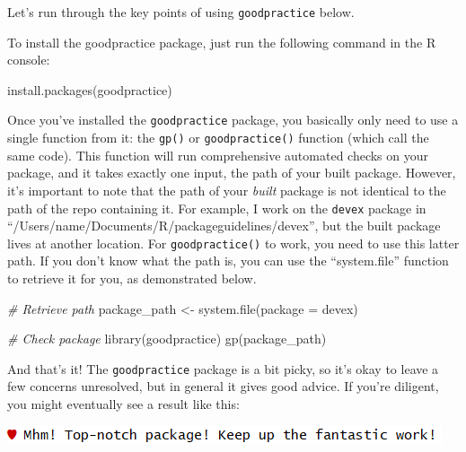 \documentclass[
]{book}
\newenvironment{Shaded}{\begin{snugshade}}{\end{snugshade}}
\newcommand{\AttributeTok}[1]{\textcolor[rgb]{0.77,0.63,0.00}{#1}}
\newcommand{\CommentTok}[1]{\textcolor[rgb]{0.56,0.35,0.01}{\textit{#1}}}
\newcommand{\FunctionTok}[1]{\textcolor[rgb]{0.00,0.00,0.00}{#1}}
\newcommand{\NormalTok}[1]{#1}
\newcommand{\OtherTok}[1]{\textcolor[rgb]{0.56,0.35,0.01}{#1}}
\newcommand{\StringTok}[1]{\textcolor[rgb]{0.31,0.60,0.02}{#1}}
\begin{document}
Let's run through the key points of using \texttt{goodpractice} below.

To install the goodpractice package, just run the following command in the R console:

\begin{Shaded}
\begin{Highlighting}[]
\FunctionTok{install.packages}\NormalTok{(}\StringTok{\textquotesingle{}goodpractice\textquotesingle{}}\NormalTok{)}
\end{Highlighting}
\end{Shaded}

Once you've installed the \texttt{goodpractice} package, you basically only need to use a single function from it: the \texttt{gp()} or \texttt{goodpractice()} function (which call the same code). This function will run comprehensive automated checks on your package, and it takes exactly one input, the path of your built package. However, it's important to note that the path of your \emph{built} package is not identical to the path of the repo containing it. For example, I work on the \texttt{devex} package in ``/Users/name/Documents/R/packageguidelines/devex'', but the built package lives at another location. For \texttt{goodpractice()} to work, you need to use this latter path. If you don't know what the path is, you can use the ``system.file'' function to retrieve it for you, as demonstrated below.

\begin{Shaded}
\begin{Highlighting}[]
\CommentTok{\# Retrieve path}
\NormalTok{package\_path }\OtherTok{\textless{}{-}} \FunctionTok{system.file}\NormalTok{(}\AttributeTok{package =} \StringTok{\textquotesingle{}devex\textquotesingle{}}\NormalTok{)}

\CommentTok{\# Check package}
\FunctionTok{library}\NormalTok{(goodpractice)}
\FunctionTok{gp}\NormalTok{(package\_path)}
\end{Highlighting}
\end{Shaded}

And that's it! The \texttt{goodpractice} package is a bit picky, so it's okay to leave a few concerns unresolved, but in general it gives good advice. If you're diligent, you might eventually see a result like this:

\includegraphics{images/testSS/goodpractice2.PNG}
\end{document}
